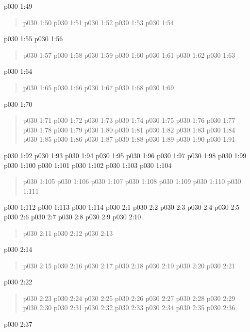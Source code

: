 \vsetspace
\vs p030 1:49 
\begin{quote}
\vs p030 1:50 
\vs p030 1:51 
\vs p030 1:52 
\vs p030 1:53 
\vs p030 1:54 
\end{quote}
\vsetspace
\vs p030 1:55 
\vsetspace
\vs p030 1:56 
\begin{quote}
\vs p030 1:57 
\vs p030 1:58 
\vs p030 1:59 
\vs p030 1:60 
\vs p030 1:61 
\vs p030 1:62 
\vs p030 1:63 
\end{quote}
\vsetspace
\vs p030 1:64 
\begin{quote}
\vs p030 1:65 
\vs p030 1:66 
\vs p030 1:67 
\vs p030 1:68 
\vs p030 1:69 
\end{quote}
\vsetspace
\vs p030 1:70 
\begin{quote}
\vs p030 1:71 
\vs p030 1:72 
\vs p030 1:73 
\vs p030 1:74 
\vs p030 1:75 
\vs p030 1:76 
\vs p030 1:77 
\vs p030 1:78 
\vs p030 1:79 
\vs p030 1:80 
\vs p030 1:81 
\vs p030 1:82 
\vs p030 1:83 
\vs p030 1:84 
\vs p030 1:85 
\vs p030 1:86 
\vs p030 1:87 
\vs p030 1:88 
\vs p030 1:89 
\vs p030 1:90 
\vs p030 1:91 
\end{quote}
\vsetspace
\vs p030 1:92 
\vs p030 1:93 
\vs p030 1:94 
\vs p030 1:95 
\vs p030 1:96 
\vs p030 1:97 
\vs p030 1:98 
\vs p030 1:99 \pc 
\vsetspace
\vs p030 1:100 
\vs p030 1:101 
\vs p030 1:102 
\vsetspace
\vs p030 1:103 
\vsetspace
\vs p030 1:104 
\begin{quote}
\vs p030 1:105 
\vs p030 1:106 
\vs p030 1:107 
\vs p030 1:108 
\vs p030 1:109 
\vs p030 1:110 
\vs p030 1:111 
\end{quote}
\vs p030 1:112 \pc 
\vs p030 1:113 
\vs p030 1:114 \pc 
{}
\vs p030 2:1 
\vs p030 2:2 
\vs p030 2:3 
\vs p030 2:4 
\vs p030 2:5 
\vs p030 2:6 
\vs p030 2:7 
\vs p030 2:8 
\vs p030 2:9 \pc 
\vsetspace
\vs p030 2:10 
\begin{quote}
\vs p030 2:11 
\vs p030 2:12 
\vs p030 2:13 
\end{quote}
\vsetspace
\vs p030 2:14 
\begin{quote}
\vs p030 2:15 
\vs p030 2:16 
\vs p030 2:17 
\vs p030 2:18 
\vs p030 2:19 
\vs p030 2:20 
\vs p030 2:21 
\end{quote}
\vsetspace
\vs p030 2:22 
\begin{quote}
\vs p030 2:23 
\vs p030 2:24 
\vs p030 2:25 
\vs p030 2:26 
\vs p030 2:27 
\vs p030 2:28 
\vs p030 2:29 
\vs p030 2:30 
\vs p030 2:31 
\vs p030 2:32 
\vs p030 2:33 
\vs p030 2:34 
\vs p030 2:35 
\vs p030 2:36 
\end{quote}
\vsetspace
\vs p030 2:37 
\vsetspace
